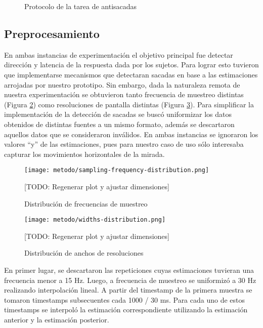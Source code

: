 \begin{figure}
    \centering
    \caption{Protocolo de la tarea de antisacadas}
    \label{fig:antisaccades-protocol}
\end{figure}

\subsection{Preprocesamiento} \label{section:preprocessing}

En ambas instancias de experimentación el objetivo principal fue detectar
dirección y latencia de la respuesta dada por los sujetos.
Para lograr esto tuvieron que implementarse mecanismos que detectaran sacadas
en base a las estimaciones arrojadas por nuestro prototipo.
Sin embargo, dada la naturaleza remota de nuestra experimentación se obtuvieron
tanto frecuencia de muestreo distintas (Figura
\ref{fig:sampling-frequency-distribution}) como resoluciones de pantalla
distintas (Figura \ref{fig:widths-distribution}).
Para simplificar la implementación de la detección de sacadas se buscó
uniformizar los datos obtenidos de distintas fuentes a un mismo formato, además
se descartaron aquellos datos que se consideraron inválidos.
En ambas instancias se ignoraron los valores “y” de las estimaciones, pues para
nuestro caso de uso sólo interesaba capturar los movimientos horizontales de la
mirada.

\begin{figure}
  \centering
  \texttt{[image: metodo/sampling-frequency-distribution.png]}
  \caption{Distribución de frecuencias de muestreo}
  [TODO: Regenerar plot y ajustar dimensiones]
  \label{fig:sampling-frequency-distribution}
\end{figure}

\begin{figure}
  \centering
  \texttt{[image: metodo/widths-distribution.png]}
  \caption{Distribución de anchos de resoluciones}
  [TODO: Regenerar plot y ajustar dimensiones]
  \label{fig:widths-distribution}
\end{figure}

En primer lugar, se descartaron las repeticiones cuyas estimaciones tuvieran
una frecuencia menor a 15 Hz.
Luego, a frecuencia de muestreo se uniformizó a 30 Hz realizando interpolación
lineal.
A partir del timestamp de la primera muestra se tomaron timestamps subsecuentes
cada 1000 / 30 ms.
Para cada uno de estos timestamps se interpoló la estimación correspondiente
utilizando la estimación anterior y la estimación posterior. 

